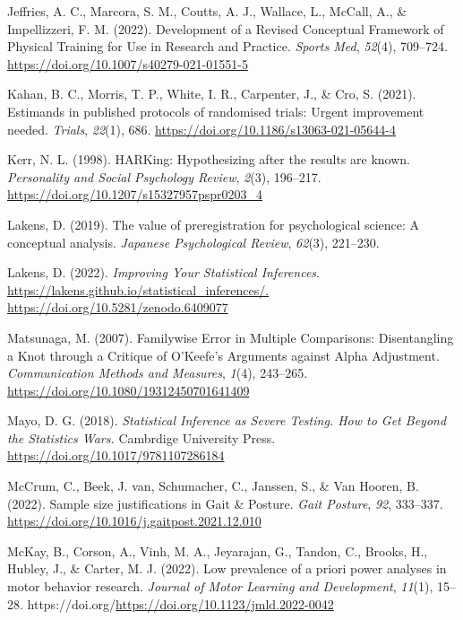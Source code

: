 \documentclass[
]{article}
\newlength{\cslhangindent}
\newenvironment{CSLReferences}[2] %
 {\begin{list}{}{%
  \setlength{\itemindent}{0pt}
  \setlength{\leftmargin}{0pt}
  \setlength{\parsep}{0pt}
  \ifodd #1
   \setlength{\leftmargin}{\cslhangindent}
   \setlength{\itemindent}{-1\cslhangindent}
  \fi
  \setlength{\itemsep}{#2\baselineskip}}}
 {\end{list}}
\begin{document}
\begin{CSLReferences}{1}{0}
Jeffries, A. C., Marcora, S. M., Coutts, A. J., Wallace, L., McCall, A.,
\& Impellizzeri, F. M. (2022). Development of a {Revised} {Conceptual}
{Framework} of {Physical} {Training} for {Use} in {Research} and
{Practice}. \emph{Sports Med}, \emph{52}(4), 709--724.
\url{https://doi.org/10.1007/s40279-021-01551-5}

Kahan, B. C., Morris, T. P., White, I. R., Carpenter, J., \& Cro, S.
(2021). Estimands in published protocols of randomised trials: Urgent
improvement needed. \emph{Trials}, \emph{22}(1), 686.
\url{https://doi.org/10.1186/s13063-021-05644-4}

Kerr, N. L. (1998). HARKing: Hypothesizing after the results are known.
\emph{Personality and Social Psychology Review}, \emph{2}(3), 196--217.
\url{https://doi.org/10.1207/s15327957pspr0203_4}

Lakens, D. (2019). The value of preregistration for psychological
science: A conceptual analysis. \emph{Japanese Psychological Review},
\emph{62}(3), 221--230.

Lakens, D. (2022). \emph{Improving {Your} {Statistical} {Inferences}}.
\href{https://lakens.github.io/statistical_inferences/.\%20https://doi.org/10.5281/zenodo.6409077}{https://lakens.github.io/statistical\_inferences/.
https://doi.org/10.5281/zenodo.6409077}

Matsunaga, M. (2007). Familywise {Error} in {Multiple} {Comparisons}:
{Disentangling} a {Knot} through a {Critique} of {O}'{Keefe}'s
{Arguments} against {Alpha} {Adjustment}. \emph{Communication Methods
and Measures}, \emph{1}(4), 243--265.
\url{https://doi.org/10.1080/19312450701641409}

Mayo, D. G. (2018). \emph{Statistical {Inference} as {Severe} {Testing}.
{How} to {Get} {Beyond} the {Statistics} {Wars}.} Cambrdige University
Press. \url{https://doi.org/10.1017/9781107286184}

McCrum, C., Beek, J. van, Schumacher, C., Janssen, S., \& Van Hooren, B.
(2022). Sample size justifications in {Gait} \& {Posture}. \emph{Gait
Posture}, \emph{92}, 333--337.
\url{https://doi.org/10.1016/j.gaitpost.2021.12.010}

McKay, B., Corson, A., Vinh, M. A., Jeyarajan, G., Tandon, C., Brooks,
H., Hubley, J., \& Carter, M. J. (2022). Low prevalence of a priori
power analyses in motor behavior research. \emph{Journal of Motor
Learning and Development}, \emph{11}(1), 15--28.
https://doi.org/\url{https://doi.org/10.1123/jmld.2022-0042}


\end{CSLReferences}
\end{document}
